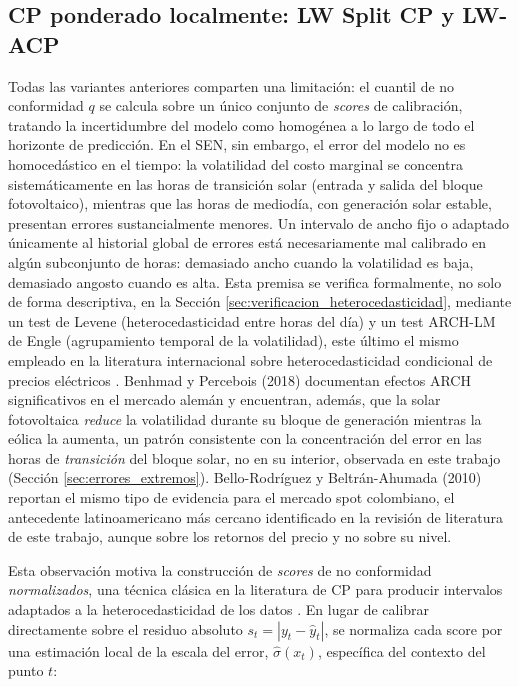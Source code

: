\subsection{CP ponderado localmente: LW Split CP y LW-ACP}
\label{sec:lwacp}

Todas las variantes anteriores comparten una limitación: el cuantil de no conformidad $q$ se calcula sobre un único conjunto de \textit{scores} de calibración, tratando la incertidumbre del modelo como homogénea a lo largo de todo el horizonte de predicción. En el SEN, sin embargo, el error del modelo no es homocedástico en el tiempo: la volatilidad del costo marginal se concentra sistemáticamente en las horas de transición solar (entrada y salida del bloque fotovoltaico), mientras que las horas de mediodía, con generación solar estable, presentan errores sustancialmente menores. Un intervalo de ancho fijo o adaptado únicamente al historial global de errores está necesariamente mal calibrado en algún subconjunto de horas: demasiado ancho cuando la volatilidad es baja, demasiado angosto cuando es alta. Esta premisa se verifica formalmente, no solo de forma descriptiva, en la Sección \ref{sec:verificacion_heterocedasticidad}, mediante un test de Levene \cite{Levene1960, BrownForsythe1974} (heterocedasticidad entre horas del día) y un test ARCH-LM de Engle \cite{Engle1982} (agrupamiento temporal de la volatilidad), este último el mismo empleado en la literatura internacional sobre heterocedasticidad condicional de precios eléctricos \cite{BenhmadPercebois2018, FletenParaschivSchurle2013, BelloBeltran2010}. Benhmad y Percebois (2018) \cite{BenhmadPercebois2018} documentan efectos ARCH significativos en el mercado alemán y encuentran, además, que la solar fotovoltaica \textit{reduce} la volatilidad durante su bloque de generación mientras la eólica la aumenta, un patrón consistente con la concentración del error en las horas de \textit{transición} del bloque solar, no en su interior, observada en este trabajo (Sección \ref{sec:errores_extremos}). Bello-Rodríguez y Beltrán-Ahumada (2010) \cite{BelloBeltran2010} reportan el mismo tipo de evidencia para el mercado spot colombiano, el antecedente latinoamericano más cercano identificado en la revisión de literatura de este trabajo, aunque sobre los retornos del precio y no sobre su nivel.

Esta observación motiva la construcción de \textit{scores} de no conformidad \textit{normalizados}, una técnica clásica en la literatura de CP para producir intervalos adaptados a la heterocedasticidad de los datos \cite{VovkCP}. En lugar de calibrar directamente sobre el residuo absoluto $s_t = |y_t - \hat{y}_t|$, se normaliza cada score por una estimación local de la escala del error, $\hat{\sigma}(x_t)$, específica del contexto del punto $t$:

